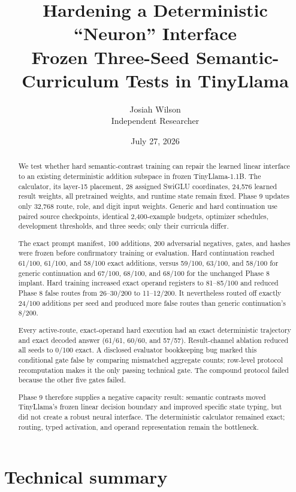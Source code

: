 \documentclass[11pt]{article}
\title{\textbf{Hardening a Deterministic ``Neuron'' Interface}\\
\large Frozen Three-Seed Semantic-Curriculum Tests in TinyLlama}
\author{Josiah Wilson\\Independent Researcher}
\date{July 27, 2026}
\begin{document}
\maketitle

\begin{abstract}
We test whether hard semantic-contrast training can repair the learned linear
interface to an existing deterministic addition subspace in frozen
TinyLlama-1.1B. The calculator, its layer-15 placement, 28 assigned SwiGLU
coordinates, 24,576 learned result weights, all pretrained weights, and runtime
state remain fixed. Phase 9 updates only 32,768 route, role, and digit input
weights. Generic and hard continuation use paired source checkpoints,
identical 2,400-example budgets, optimizer schedules, development thresholds,
and three seeds; only their curricula differ.

The exact prompt manifest, 100 additions, 200 adversarial negatives, gates,
and hashes were frozen before confirmatory training or evaluation. Hard
continuation reached 61/100, 61/100, and 58/100 exact additions, versus
59/100, 63/100, and 58/100 for generic continuation and 67/100, 68/100, and
68/100 for the unchanged Phase 8 implant. Hard training increased exact
operand registers to 81--85/100 and reduced Phase 8 false routes from
26--30/200 to 11--12/200. It nevertheless routed off exactly 24/100 additions
per seed and produced more false routes than generic continuation's 8/200.

Every active-route, exact-operand hard execution had an exact deterministic
trajectory and exact decoded answer (61/61, 60/60, and 57/57). Result-channel
ablation reduced all seeds to 0/100 exact. A disclosed evaluator bookkeeping
bug marked this conditional gate false by comparing mismatched aggregate
counts; row-level protocol recomputation makes it the only passing technical
gate. The compound protocol failed because the other five gates failed.

Phase 9 therefore supplies a negative capacity result: semantic contrasts
moved TinyLlama's frozen linear decision boundary and improved specific state
typing, but did not create a robust neural interface. The deterministic
calculator remained exact; routing, typed activation, and operand
representation remain the bottleneck.
\end{abstract}

\section*{Technical summary}
\end{document}
